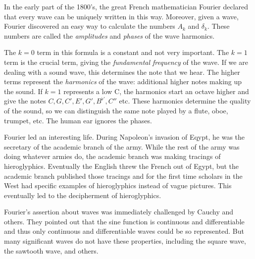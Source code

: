 \documentclass[11pt, oneside]{amsart}
\begin{document}
In the early part of the 1800's, the great French mathematician Fourier declared that every wave can be uniquely written in this way. Moreover, given a wave, Fourier discovered an easy way to calculate the numbers $A_k$ and $\delta_k$. These numbers are called the {\em amplitudes} and {\em phases} of the wave harmonics.


The $k = 0$ term in this formula is a constant and not very important. The $k = 1$ term is the crucial term, giving the {\em fundamental frequency} of the wave. If we are dealing with a sound wave, this determines the note that we hear. The higher terms represent the {\em harmonics} of the wave: additional higher notes making up the sound.  If $k = 1$ represents a low C, the harmonics start an octave higher and give the notes $C, G, C', E', G', B^{\flat'}, C''$ etc. These harmonics determine the quality of the sound, so we can distinguish the same note played by a flute, oboe, trumpet, etc. The human ear ignores the phases.

Fourier led an interesting life. During Napoleon's invasion of Eqypt, he was the secretary of the academic branch of the army. While the rest of the army was doing whatever armies do, the academic branch was making tracings of hieroglyphics. Eventually the English threw the French out of Egypt, but the academic branch published those tracings and for the first time scholars in the West had specific examples of hieroglyphics instead of vague pictures. This eventually led to the decipherment of hieroglyphics.

Fourier's assertion about waves was immediately challenged by Cauchy and others. They pointed out that the sine function is continuous and differentiable and thus only continuous and differentiable waves could be so represented. But many significant waves do not have these properties, including the square wave, the sawtooth wave, and others.  
\end{document}
